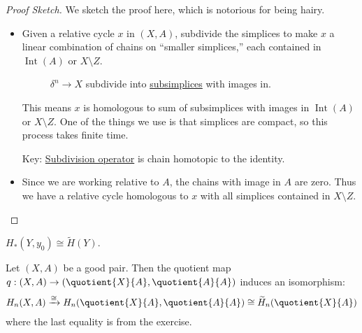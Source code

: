 \begin{proof}[Proof Sketch]
	We sketch the proof here, which is notorious for being hairy.
	\begin{itemize}
		\item Given a relative cycle $x$ in $(X, A)$, subdivide the simplices to make $x$ a linear combination of chains on
		      ``smaller simplices,'' each contained in $\operatorname{Int}(A)$ or $X \setminus Z$.
		      \begin{figure}[H]
			      \centering
			      \caption{\(\delta ^n\to X\) subdivide into \hyperref[def:subsimplex]{subsimplices} with images in. }
			      \label{fig:pf:excision}
		      \end{figure}
		      This means $x$ is homologous to sum of subsimplices with images in $\operatorname{Int}(A)$ or $X \setminus Z$. One of the things we
		      use is that simplices are compact, so this process takes finite time.

		      Key: \underline{Subdivision operator} is chain homotopic to the identity.
		\item Since we are working relative to $A$, the chains with image in $A$ are zero. Thus we have a relative cycle homologous to $x$
		      with all simplices contained in $X \setminus Z$.
	\end{itemize}
\end{proof}

\begin{exercise}
	$H_\ast(Y, y_0) \cong \widetilde{H}(Y)$.
\end{exercise}

\begin{theorem}\label{thm:good-pairs-relative-homology}
	Let $(X, A)$ be a good pair. Then the quotient map $q : (X, A) \to (\quotient{X}{A} , \quotient{A}{A} )$ induces an isomorphism:
	\begin{align*}
		H_n(X, A) \xrightarrow{\cong} H_n(\quotient{X}{A}, \quotient{A}{A}) \cong \widetilde{H}_n(\quotient{X}{A})
	\end{align*}
	where the last equality is from the exercise.
\end{theorem}

